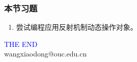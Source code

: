 \begin{frame}
  \frametitle{本节习题}
  

  \begin{enumerate}
  \item 尝试编程应用反射机制动态操作对象。
  \end{enumerate}
\end{frame}
\begin{frame}
\centering
{\Huge \textcolor{blue}{THE END}} \\
\vspace{5mm}
{\Large wangxiaodong@ouc.edu.cn} \\
\end{frame}

